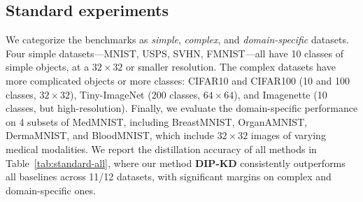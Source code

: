 \subsection{Standard experiments} \label{ssec:04-experiments-standard}
\begin{foldable} %
  We categorize the benchmarks as \textit{simple}, \textit{complex}, and \textit{domain-specific} datasets.
  Four simple datasets---MNIST, USPS, SVHN, FMNIST---all have 10 classes of simple objects, at a $32\times32$ or smaller resolution.
  The complex datasets have more complicated objects or more classes: CIFAR10 and CIFAR100 (10 and 100 classes, $32\times32$), Tiny-ImageNet (200 classes, $64\times64$), and Imagenette (10 classes, but high-resolution).
  Finally, we evaluate the domain-specific performance on 4 subsets of MedMNIST, including BreastMNIST, OrganAMNIST, DermaMNIST, and BloodMNIST, which include $32\times32$ images of varying medical modalities.
  We report the distillation accuracy of all methods in Table~\ref{tab:standard-all}, where our method \textbf{DIP-KD} consistently outperforms all baselines across 11/12 datasets, with significant margins on complex and domain-specific ones.
\end{foldable}

